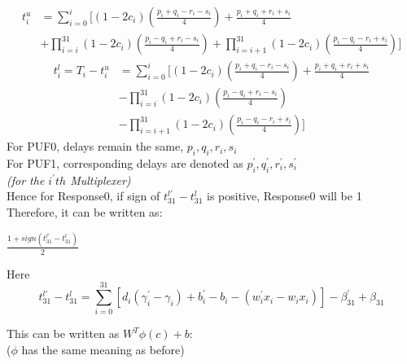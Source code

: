 \documentclass{article}
\begin{document}
\begin{equation}
  \begin{split}
    t_i^u &= \sum_{i=0}^{i}[(1-2c_i)(\frac{p_i + q_i - r_i - s_i}{4}) + \frac{p_i + q_i + r_i + s_i}{4} \\
          &+ \prod_{i=i}^{31}(1-2c_i)(\frac{p_i - q_i +r_i - s_i}{4}) + \prod_{i=i+1}^{31}(1-2c_i)(\frac{p_i - q_i -r_i + s_i}{4})]
  \end{split}
\end{equation}
\begin{equation}
  \begin{split}
    t_i^l = T_i - t_i^u &= \sum_{i=0}^{i}[(1-2c_i)(\frac{p_i + q_i - r_i - s_i}{4}) + \frac{p_i + q_i + r_i + s_i}{4} \\
                        &- \prod_{i=i}^{31} (1-2c_i)(\frac{p_i - q_i + r_i - s_i}{4}) \\
                        &- \prod_{i=i+1}^{31} (1-2c_i)(\frac{p_i - q_i - r_i + s_i}{4})]
  \end{split}
\end{equation}
\large
For PUF0, delays remain the same, $p_i, q_i, r_i, s_i$\\
For PUF1, corresponding delays are denoted as $p_i^{'}, q_i^{'}, r_i^{'}, s_i^{'}$\\
\textit{(for the $i^{'} th$ Multiplexer)}\\
Hence for Response0, if sign of $t_{31}^{l'} - t_{31}^l$ is positive, Response0 will be 1\\

Therefore, it can be written as:
\Large
\begin{center}
  $\frac{1 + sign(t_{31}^{l'} - t_{31}^l)}{2}$
\end{center}
\large
Here 
\Large
\begin{equation}
  t_{31}^{l'} - t_{31}^l = \sum_{i=0}^{31}[d_i (\gamma_i^{'} - \gamma_i) + b_i^{'} - b_i - (w_i^{'}x_i - w_ix_i)] - \beta_{31}^{'} + \beta_{31}
\end{equation}


\large This can be written as $W^{T}\phi(c) + b:$\\ ($\phi$ has the same meaning as before)
\end{document}
